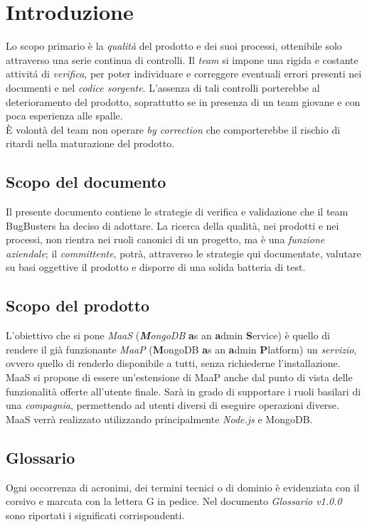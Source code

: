 \section{Introduzione}
Lo scopo primario è la \textit{qualit\`a} del prodotto e dei suoi processi, ottenibile solo attraverso una serie continua di controlli. Il \textit{team} si impone una rigida e costante attivit\'a di \textit{verifica}, per poter individuare e correggere eventuali errori presenti nei documenti e nel \textit{codice sorgente}. L'assenza di tali controlli porterebbe al deterioramento del prodotto, soprattutto se in presenza di un team giovane e con poca esperienza alle spalle. \\
\`E volont\`a del team non operare \textit{by correction} che comporterebbe il rischio di ritardi nella maturazione del prodotto.

\subsection{Scopo del documento}
Il presente documento contiene le strategie di verifica e validazione che il team BugBusters ha deciso di adottare. La ricerca della qualit\`a, nei prodotti e nei processi, non rientra nei ruoli canonici di un progetto, ma \`e una \textit{funzione aziendale}; il \textit{committente}, potrà, attraverso le strategie qui documentate, valutare su basi oggettive il prodotto e disporre di una solida batteria di test.

\subsection{Scopo del prodotto}
L'obiettivo che si pone \textit{MaaS} (\textit{\textbf{M}ongoDB} \textbf{a}s an \textbf{a}dmin \textbf{S}ervice) \`e quello di rendere il gi\`a funzionante \textit{MaaP} (\textbf{M}ongoDB \textbf{a}s an \textbf{a}dmin \textbf{P}latform) un \textit{servizio}, ovvero quello di renderlo disponibile a tutti, senza richiederne l'installazione. MaaS si propone di essere un'estensione di MaaP anche dal punto di vista delle funzionalit\`a offerte all'utente finale. Sar\`a in grado di supportare i ruoli basilari di una \textit{compagnia}, permettendo ad utenti diversi di eseguire operazioni diverse. \\
MaaS verr\`a realizzato utilizzando principalmente \textit{Node.js} e MongoDB.

\subsection{Glossario}
Ogni occorrenza di acronimi, dei termini tecnici o di dominio \`e evidenziata con il corsivo e marcata con la lettera G in pedice. Nel documento \textit{Glossario v1.0.0} sono riportati i significati corrispondenti.

